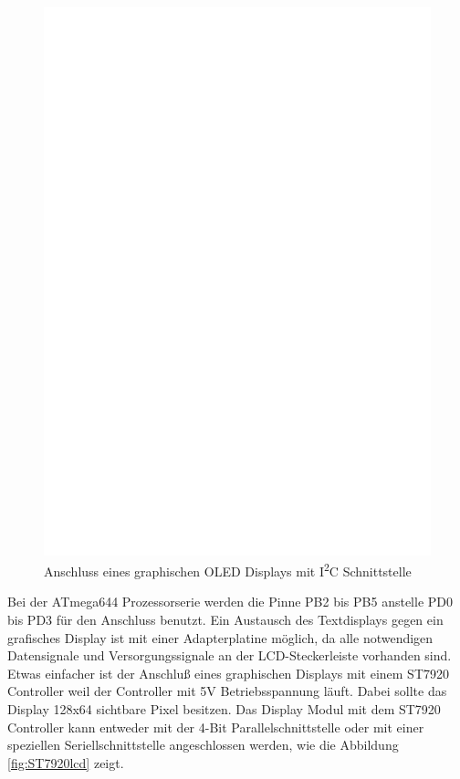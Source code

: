 \begin{figure}[H]
\centering
\includegraphics[width=14cm]{../FIG/SSD1306_I2C.eps}
\caption{Anschluss eines graphischen OLED Displays mit I\textsuperscript{2}C Schnittstelle}
\label{fig:ssd1306i2c}
\end{figure}

Bei der ATmega644 Prozessorserie werden die Pinne PB2 bis PB5 anstelle PD0 bis PD3 für den Anschluss benutzt.
Ein Austausch des Textdisplays gegen ein grafisches Display ist mit einer Adapterplatine möglich, da
alle notwendigen Datensignale und Versorgungssignale an der LCD-Steckerleiste vorhanden sind.
Etwas einfacher ist der Anschluß eines graphischen Displays mit einem ST7920 Controller weil 
der Controller mit 5V Betriebsspannung läuft.
Dabei sollte das Display 128x64 sichtbare Pixel besitzen.
Das Display Modul mit dem ST7920 Controller kann entweder mit der 4-Bit Parallelschnittstelle oder mit einer 
speziellen Seriellschnittstelle angeschlossen werden, wie die Abbildung \ref{fig:ST7920lcd} zeigt.
 

